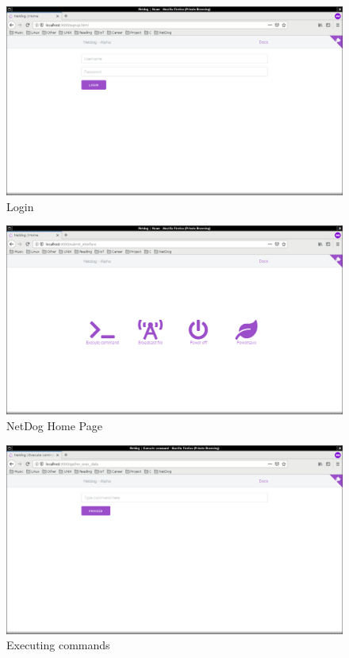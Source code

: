 \begin{figure}[H]
\includegraphics[scale=0.3]{login}
\caption{Login}
\end{figure}

\begin{figure}[H]
\includegraphics[scale=0.3]{netdog_home}
\caption{NetDog Home Page}
\end{figure}

\begin{figure}[H]
\includegraphics[scale=0.3]{netdog_execute}
\caption{Executing commands}
\end{figure}

